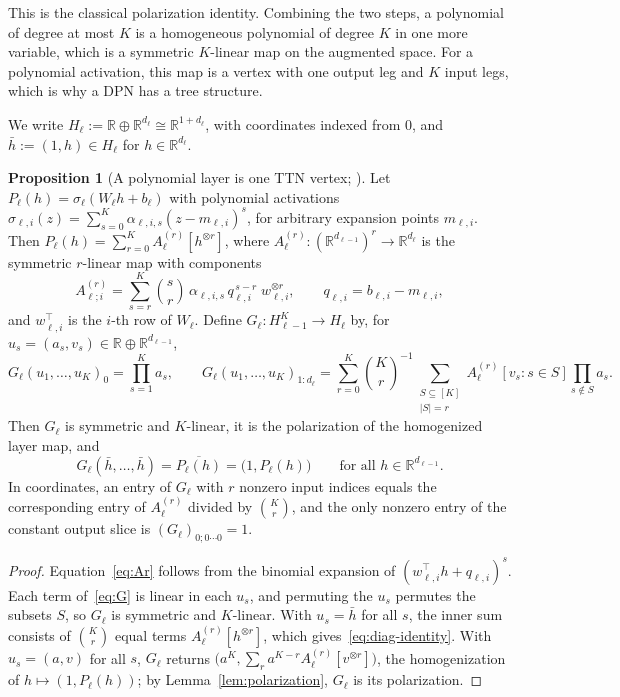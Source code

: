\documentclass[11pt]{article}
\newcommand{\R}{\mathbb{R}}
\newcommand{\hb}{\bar{h}}
\theoremstyle{definition}
\newtheorem{proposition}[theorem]{Proposition}
\numberwithin{equation}{section}
\begin{document}
This is the classical polarization identity. Combining the two steps, a polynomial of degree at most $K$ is a homogeneous polynomial of degree $K$ in one more variable, which is a symmetric $K$-linear map on the augmented space. For a polynomial activation, this map is a vertex with one output leg and $K$ input legs, which is why a DPN has a tree structure.

We write $H_\ell:=\R\oplus\R^{d_\ell}\cong\R^{1+d_\ell}$, with coordinates indexed from $0$, and $\hb:=(1,h)\in H_\ell$ for $h\in\R^{d_\ell}$.

\begin{proposition}[A polynomial layer is one TTN vertex; {\citealp[Section~3]{hfl_local}}]\label{prop:layer-core}
Let $P_\ell(h)=\sigma_\ell(W_\ell h+b_\ell)$ with polynomial activations $\sigma_{\ell,i}(z)=\sum_{s=0}^K\alpha_{\ell,i,s}(z-m_{\ell,i})^s$, for arbitrary expansion points $m_{\ell,i}$. Then $P_\ell(h)=\sum_{r=0}^KA_\ell^{(r)}[h^{\otimes r}]$, where $A_\ell^{(r)}:(\R^{d_{\ell-1}})^r\to\R^{d_\ell}$ is the symmetric $r$-linear map with components
\begin{equation}\label{eq:Ar}
A^{(r)}_{\ell;i}=\sum_{s=r}^K\binom{s}{r}\,\alpha_{\ell,i,s}\,q_{\ell,i}^{\,s-r}\;w_{\ell,i}^{\otimes r},\qquad q_{\ell,i}=b_{\ell,i}-m_{\ell,i},
\end{equation}
and $w_{\ell,i}^\top$ is the $i$-th row of $W_\ell$. Define $G_\ell:H_{\ell-1}^K\to H_\ell$ by, for $u_s=(a_s,v_s)\in\R\oplus\R^{d_{\ell-1}}$,
\begin{equation}\label{eq:G}
G_\ell(u_1,\dots,u_K)_0=\prod_{s=1}^Ka_s,\qquad
G_\ell(u_1,\dots,u_K)_{1:d_\ell}=\sum_{r=0}^K\binom{K}{r}^{-1}\sum_{\substack{S\subseteq[K]\\|S|=r}}A_\ell^{(r)}[v_s:s\in S]\prod_{s\notin S}a_s .
\end{equation}
Then $G_\ell$ is symmetric and $K$-linear, it is the polarization of the homogenized layer map, and
\begin{equation}\label{eq:diag-identity}
G_\ell(\hb,\dots,\hb)=\overline{P_\ell(h)}=\big(1,P_\ell(h)\big)\qquad\text{for all }h\in\R^{d_{\ell-1}}.
\end{equation}
In coordinates, an entry of $G_\ell$ with $r$ nonzero input indices equals the corresponding entry of $A_\ell^{(r)}$ divided by $\binom Kr$, and the only nonzero entry of the constant output slice is $(G_\ell)_{0;0\cdots0}=1$.
\end{proposition}

\begin{proof}
Equation~\eqref{eq:Ar} follows from the binomial expansion of $(w_{\ell,i}^\top h+q_{\ell,i})^s$. Each term of~\eqref{eq:G} is linear in each $u_s$, and permuting the $u_s$ permutes the subsets $S$, so $G_\ell$ is symmetric and $K$-linear. With $u_s=\hb$ for all $s$, the inner sum consists of $\binom Kr$ equal terms $A^{(r)}_\ell[h^{\otimes r}]$, which gives~\eqref{eq:diag-identity}. With $u_s=(a,v)$ for all $s$, $G_\ell$ returns $\big(a^K,\sum_ra^{K-r}A_\ell^{(r)}[v^{\otimes r}]\big)$, the homogenization of $h\mapsto(1,P_\ell(h))$; by Lemma~\ref{lem:polarization}, $G_\ell$ is its polarization.
\end{proof}
\end{document}

